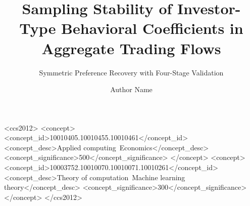 \documentclass[sigconf,nonacm]{acmart}
\begin{document}
\title{Sampling Stability of Investor-Type Behavioral Coefficients in Aggregate Trading Flows}
\subtitle{Symmetric Preference Recovery with Four-Stage Validation}

\author{Author Name}
\renewcommand{\shortauthors}{Author Name}

\begin{CCSXML}
<ccs2012>
<concept>
<concept_id>10010405.10010455.10010461</concept_id>
<concept_desc>Applied computing~Economics</concept_desc>
<concept_significance>500</concept_significance>
</concept>
<concept>
<concept_id>10003752.10010070.10010071.10010261</concept_id>
<concept_desc>Theory of computation~Machine learning theory</concept_desc>
<concept_significance>300</concept_significance>
</concept>
</ccs2012>
\end{CCSXML}



\maketitle





\end{document}
